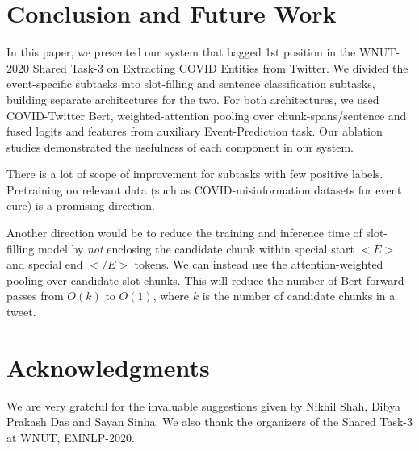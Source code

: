 \documentclass[11pt,a4paper]{article}
\begin{document}
\section{Conclusion and Future Work}

In this paper, we presented our system that bagged 1st position in the WNUT-2020 Shared Task-3 on Extracting COVID Entities from Twitter. We divided the event-specific subtasks into slot-filling and sentence classification subtasks, building separate architectures for the two. For both architectures, we used COVID-Twitter Bert, weighted-attention pooling over chunk-spans/sentence and fused logits and features from auxiliary Event-Prediction task. Our ablation studies demonstrated the usefulness of each component in our system.

There is a lot of scope of improvement for subtasks with few positive labels. Pretraining on relevant data (such as COVID-misinformation datasets for event cure) is a promising direction.

Another direction would be to reduce the training and inference time of slot-filling model by \textit{not} enclosing the candidate chunk within special start $<E>$ and special end $</E>$ tokens. We can instead use the attention-weighted pooling over candidate slot chunks. This will reduce the number of Bert forward passes from $O(k)$ to $O(1)$, where $k$ is the number of candidate chunks in a tweet.

\section*{Acknowledgments}

We are very grateful for the invaluable suggestions given by Nikhil Shah, Dibya Prakash Das and Sayan Sinha. We also thank the organizers of the Shared Task-3 at WNUT, EMNLP-2020.



\end{document}
